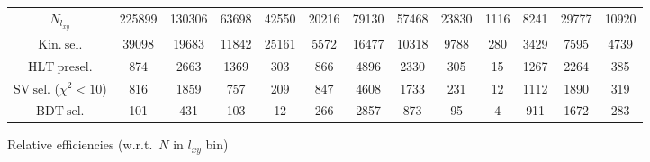 \documentclass[10pt,a4paper]{article}
\begin{document}
\begin{landscape}
{\begin{tabular}{c|cccc|cccc|cccc}
\midrule
$N_{l_{xy}}$ & 225899 & 130306 & 63698 & 42550 & 20216 & 79130 & 57468 & 23830 & 1116 & 8241 & 29777 & 10920\\
$\mathrm{Kin.\ sel.}$ & 39098 & 19683 & 11842 & 25161 & 5572 & 16477 & 10318 & 9788 & 280 & 3429 & 7595 & 4739\\
$\mathrm{HLT\ presel.}$ & 874 & 2663 & 1369 & 303 & 866 & 4896 & 2330 & 305 & 15 & 1267 & 2264 & 385\\
$\mathrm{SV\ sel.}$ ($\chi^2{<}10$) & 816 & 1859 & 757 & 209 & 847 & 4608 & 1733 & 231 & 12 & 1112 & 1890 & 319\\
$\mathrm{BDT\ sel.}$ & 101 & 431 & 103 & 12 & 266 & 2857 & 873 & 95 & 4 & 911 & 1672 & 283\\
\bottomrule
\end{tabular}}

\vspace{18pt}

Relative efficiencies (w.r.t.\ $N$ in $l_{xy}$ bin)


\end{landscape}
\end{document}
